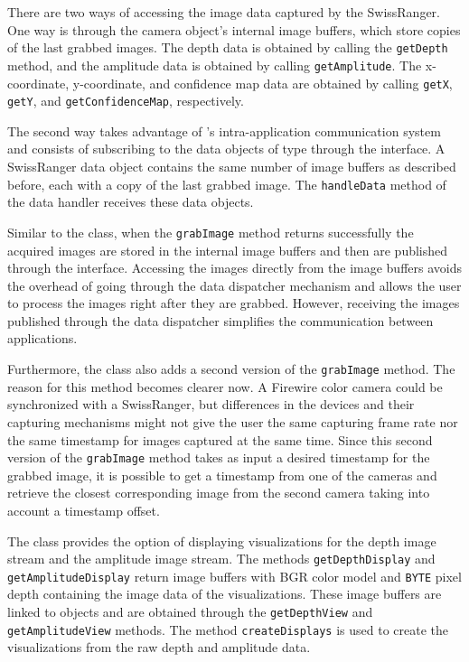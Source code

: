 There are two ways of accessing the image data captured by the SwissRanger. One way is through the 
camera object's internal image buffers, which store copies of the last grabbed images. The depth data
is obtained by calling the \texttt{get\-Depth} method, and the amplitude data is obtained by calling 
\texttt{get\-Am\-pli\-tude}. The x-coordinate, y-coordinate, and confidence map data are obtained by calling
\texttt{getX}, \texttt{getY}, and \texttt{get\-Con\-fi\-dence\-Map}, respectively.

The second way takes advantage of \RD{}'s intra-application communication system and consists of 
subscribing to the data objects of type \SwissRangerCamData{} through the \DataHandler{} interface. 
A SwissRanger data object contains the same number of image buffers as described before, each with a 
copy of the last grabbed image. The \texttt{han\-dle\-Da\-ta} method of the data handler receives these data 
objects. 

Similar to the \ColorCam{} class, when the \texttt{grab\-Im\-age} method returns successfully the acquired 
images are stored in the internal image buffers and then are published through the \DataProvider{} interface. 
Accessing the images directly from the image buffers avoids the overhead of going through the data 
dispatcher mechanism and allows the user to process the images right after they are grabbed. However, 
receiving the images published through the data dispatcher simplifies the communication between \RD{} 
applications. 

Furthermore, the \SwissRangerCam{} class also adds a second version of the \texttt{grab\-Im\-age} method.
The reason for this method becomes clearer now. A Firewire color camera could be synchronized with a 
SwissRanger, but differences in the devices and their capturing mechanisms might not give the user the 
same capturing frame rate nor the same timestamp for images captured at the same time. Since this second 
version of the \texttt{grab\-Im\-age} method takes as input a desired timestamp for the grabbed image, it is 
possible to get a timestamp from one of the cameras and retrieve the closest corresponding image from the 
second camera taking into account a timestamp offset.

The \SwissRangerCam{} class provides the option of displaying visualizations for the depth image stream 
and the amplitude image stream. The methods \texttt{get\-Depth\-Dis\-play} and 
\texttt{get\-Am\-pli\-tude\-Dis\-play} return image buffers with BGR color model and \texttt{BYTE} pixel depth 
containing the image data of the visualizations. These image buffers are linked to \ImageView{} objects and 
are obtained through the \texttt{get\-Depth\-View} and \texttt{get\-Am\-pli\-tudeView} methods. The method 
\texttt{cre\-ate\-Dis\-plays} is used to create the visualizations from the raw depth and amplitude data.

